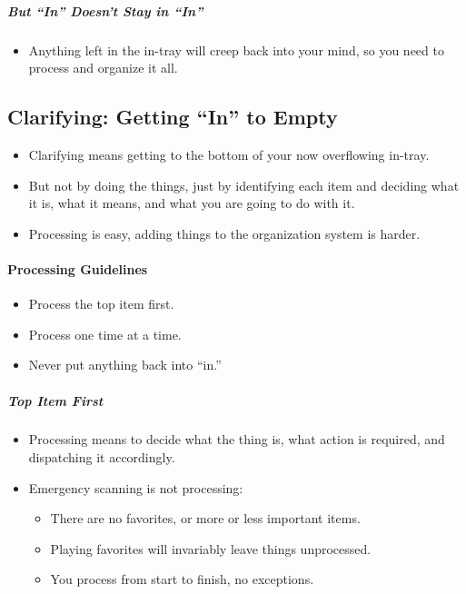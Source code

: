 \documentclass{article}
\begin{document}
\subparagraph{But ``In'' Doesn't Stay in ``In''}

\begin{itemize}
  \item Anything left in the in-tray will creep back into your mind, so you need to process and organize it all.
\end{itemize}

\subsection{Clarifying: Getting ``In'' to Empty}

\begin{itemize}
  \item Clarifying means getting to the bottom of your now overflowing in-tray.
  \item But not by doing the things, just by identifying each item and deciding what it is, what it means, and what you are going to do with it.
  \item Processing is easy, adding things to the organization system is harder.
\end{itemize}

\paragraph{Processing Guidelines}

\begin{itemize}
  \item Process the top item first.
  \item Process one time at a time.
  \item Never put anything back into ``in.''
\end{itemize}

\subparagraph{Top Item First}

\begin{itemize}
  \item Processing means to decide what the thing is, what action is required, and dispatching it accordingly.
  \item Emergency scanning is not processing:
  \begin{itemize}
    \item There are no favorites, or more or less important items.
    \item Playing favorites will invariably leave things unprocessed.
    \item You process from start to finish, no exceptions.
  \end{itemize}
\end{itemize}
\end{document}
